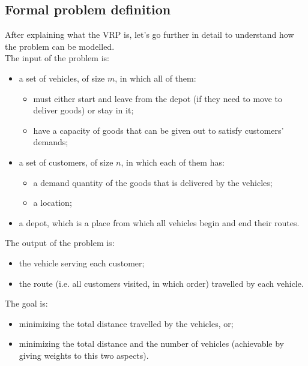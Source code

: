 \documentclass[../main.tex]{subfiles}
\begin{document}
\subsection{Formal problem definition}
After explaining what the VRP is, let's go further in detail to understand how the problem can be modelled.\\
The input of the problem is:
\begin{itemize}
    \item a set of vehicles, of size $m$, in which all of them:
    \begin{itemize}
        \item must either start and leave from the depot (if they need to move to deliver goods) or stay in it;
        \item have a capacity of goods that can be given out to satisfy customers' demands;
    \end{itemize}
    \item a set of customers, of size $n$, in which each of them has:
    \begin{itemize}
        \item a demand quantity of the goods that is delivered by the vehicles;
        \item a location;
    \end{itemize}
    \item a depot, which is a place from which all vehicles begin and end their routes.
\end{itemize}
The output of the problem is:
\begin{itemize}
    \item the vehicle serving each customer;
    \item the route (i.e. all customers visited, in which order) travelled by each vehicle.
\end{itemize}
The goal is:
\begin{itemize}
    \item minimizing the total distance travelled by the vehicles, or;
    \item minimizing the total distance and the number of vehicles (achievable by giving weights to this two aspects).
\end{itemize}
\end{document}
